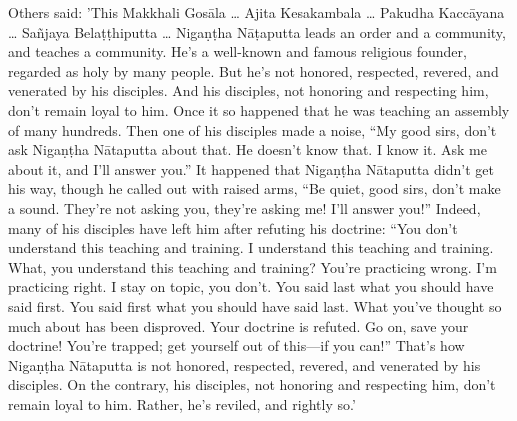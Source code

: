 \documentclass[12pt,openany]{book}%
\begin{document}
Others said: 'This Makkhali \textsanskrit{Gosāla} … Ajita Kesakambala … Pakudha \textsanskrit{Kaccāyana} … \textsanskrit{Sañjaya} \textsanskrit{Belaṭṭhiputta} … \textsanskrit{Nigaṇṭha} \textsanskrit{Nāṭaputta} leads an order and a community, and teaches a community. He’s a well-known and famous religious founder, regarded as holy by many people. But he’s not honored, respected, revered, and venerated by his disciples. And his disciples, not honoring and respecting him, don’t remain loyal to him. Once it so happened that he was teaching an assembly of many hundreds. Then one of his disciples made a noise, “My good sirs, don’t ask \textsanskrit{Nigaṇṭha} \textsanskrit{Nātaputta} about that. He doesn’t know that. I know it. Ask me about it, and I’ll answer you.” It happened that \textsanskrit{Nigaṇṭha} \textsanskrit{Nātaputta} didn’t get his way, though he called out with raised arms, “Be quiet, good sirs, don’t make a sound. They’re not asking you, they’re asking me! I’ll answer you!” Indeed, many of his disciples have left him after refuting his doctrine: “You don’t understand this teaching and training. I understand this teaching and training. What, you understand this teaching and training? You’re practicing wrong. I’m practicing right. I stay on topic, you don’t. You said last what you should have said first. You said first what you should have said last. What you’ve thought so much about has been disproved. Your doctrine is refuted. Go on, save your doctrine! You’re trapped; get yourself out of this—if you can!” That’s how \textsanskrit{Nigaṇṭha} \textsanskrit{Nātaputta} is not honored, respected, revered, and venerated by his disciples. On the contrary, his disciples, not honoring and respecting him, don’t remain loyal to him. Rather, he’s reviled, and rightly so.’ 
\end{document}
